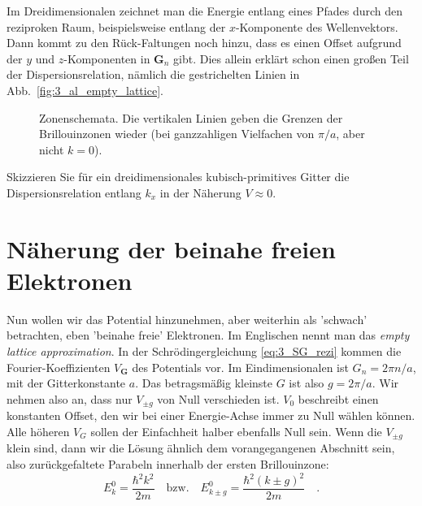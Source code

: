 Im Dreidimensionalen zeichnet man die Energie entlang eines Pfades durch den reziproken Raum, beispielsweise entlang der $x$-Komponente des Wellenvektors. Dann 
kommt zu den Rück-Faltungen noch hinzu, dass es einen Offset aufgrund der $y$ und $z$-Komponenten in $\mathbf{G}_n $ gibt. Dies allein erklärt schon einen großen Teil der Dispersionsrelation, nämlich die gestrichelten Linien in Abb.~\ref{fig:3_al_empty_lattice}.

\begin{figure}
   \caption{Zonenschemata. Die vertikalen Linien geben die Grenzen der Brillouinzonen wieder (bei ganzzahligen Vielfachen von $\pi/a$, aber nicht $k=0$). \label{fig:3_zone_scheme}}
\end{figure}

\begin{questions}
    \item Skizzieren Sie für ein dreidimensionales kubisch-primitives Gitter die Dispersionsrelation entlang $k_x$ in der Näherung $V \approx 0$.
\end{questions}



\section{Näherung der beinahe freien Elektronen}



Nun wollen wir das Potential hinzunehmen, aber weiterhin als 'schwach' betrachten, eben 'beinahe freie' Elektronen. Im Englischen  nennt man das \emph{empty lattice approximation}. In der Schrödingergleichung \ref{eq:3_SG_rezi} kommen die Fourier-Koeffizienten $V_\mathbf{G}$ des Potentials vor. Im Eindimensionalen ist $G_n = 2 \pi n / a$, mit der Gitterkonstante $a$. Das betragsmäßig kleinste $G$ ist also $g = 2 \pi / a$. Wir nehmen also an, dass nur $V_{\pm g}$ von Null verschieden ist. $V_0$ beschreibt einen konstanten Offset, den wir bei einer Energie-Achse immer zu Null wählen können. Alle höheren $V_G$ sollen der Einfachheit halber ebenfalls Null sein.  Wenn die $V_{\pm g}$ klein sind, dann wir die Lösung ähnlich dem vorangegangenen Abschnitt sein, also zurückgefaltete Parabeln innerhalb der ersten Brillouinzone:
\begin{equation}
    E_k^0 =  \frac{\hbar^2 k^2}{2m} \quad \text{bzw.} \quad    E_{k \pm g}^0 =  \frac{\hbar^2 (k  \pm g)^2}{2m}  \quad .
\end{equation}

